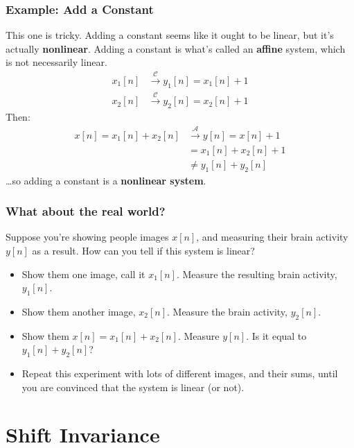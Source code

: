 \documentclass{beamer}
\begin{document}
\begin{frame}
  \frametitle{Example: Add a Constant}

  This one is tricky.  Adding a constant seems like it ought to be
  linear, but it's actually {\bf nonlinear}. Adding a constant is
  what's called an {\bf affine} system, which is not necessarily linear.
  \begin{align*}
  x_1[n] &\stackrel{\mathcal C}{\longrightarrow} y_1[n]=x_1[n]+1\\
  x_2[n] &\stackrel{\mathcal C}{\longrightarrow} y_2[n]=x_2[n]+1
  \end{align*}
  Then:
  \begin{align*}
    x[n]=x_1[n]+x_2[n] &\stackrel{\mathcal A}{\longrightarrow} y[n]=x[n]+1\\
    &= x_1[n]+x_2[n]+1\\
    &\ne y_1[n]+y_2[n]
  \end{align*}
  \ldots so adding a constant is a {\bf nonlinear system}.
\end{frame}

\begin{frame}
  \frametitle{What about the real world?}

  Suppose you're showing people images $x[n]$, and measuring their
  brain activity $y[n]$ as a result.  How can you tell if this system
  is linear?
  \begin{itemize}
  \item Show them one image, call it $x_1[n]$.  Measure the resulting
    brain activity, $y_1[n]$.
  \item Show them another image, $x_2[n]$.  Measure the brain
    activity, $y_2[n]$.
  \item Show them $x[n]=x_1[n]+x_2[n]$.  Measure $y[n]$.  Is it equal
    to $y_1[n]+y_2[n]$?
  \item Repeat this experiment with lots of different images, and
    their sums, until you are convinced that the system is linear (or not).
  \end{itemize}
\end{frame}



\section[Shift Invariance]{Shift Invariance}
\setcounter{subsection}{1}
\end{document}
